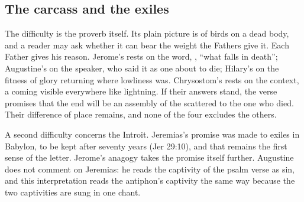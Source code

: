 \subsection{The carcass and the exiles}
\label{sec:body-difficulty}

The difficulty is the proverb itself. Its plain picture is of birds on a dead
body, and a reader may ask whether it can bear the weight the Fathers give it.
Each Father gives his reason. Jerome's rests on the word, ,
``what falls in death''; Augustine's on the speaker, who said it as one about
to die; Hilary's on the fitness of glory returning where lowliness was.
Chrysostom's rests on the context, a coming visible everywhere like lightning.
If their answers stand, the verse promises that the end will be an assembly
of the scattered to the one who died. Their difference of place remains, and
none of the four excludes the others.

A second difficulty concerns the Introit. Jeremias's promise was made to
exiles in Babylon, to be kept after seventy years (Jer 29:10), and that
remains the first sense of the letter. Jerome's anagogy takes the promise
itself further. Augustine does not comment on Jeremias: he reads the
captivity of the psalm verse as sin, and this interpretation reads the
antiphon's captivity the same way because the two captivities are sung in one
chant.

